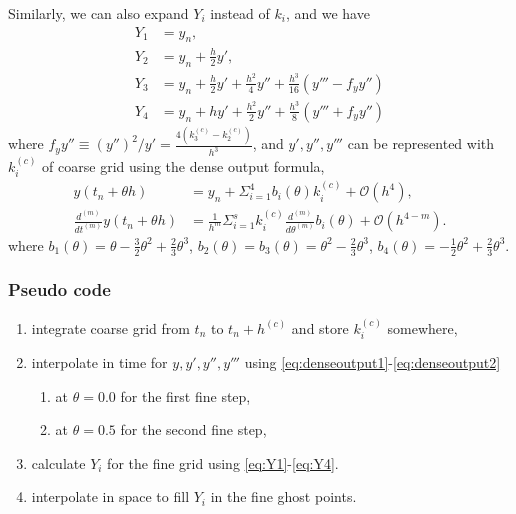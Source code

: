 \documentclass[prd,aps,a4paper,superscriptaddress,onecolumn,footinbib]{revtex4}
\begin{document}
Similarly, we can also expand $Y_i$ instead of $k_i$, and we have
\begin{align}
    Y_1&=y_n, \label{eq:Y1} \\
    Y_2&=y_n + \frac{h}{2}y', \label{eq:Y2} \\
    Y_3&=y_n + \frac{h}{2}y' + \frac{h^2}{4}y''+\frac{h^3}{16}(y'''-f_yy'') \label{eq:Y3} \\
    Y_4&=y_n + hy' + \frac{h^2}{2}y''+\frac{h^3}{8}(y'''+f_yy'') \label{eq:Y4}
\end{align}
where $f_yy''\equiv\left(y''\right)^2/y'=\frac{4(k^{(c)}_3-k^{(c)}_2)}{h^3}$,
and $y',y'',y'''$ can be represented with $k^{(c)}_i$ of coarse grid using the dense output formula,
\begin{align}
    y(t_n+\theta h)
    &=y_n+\Sigma_{i=1}^4b_i(\theta)k^{(c)}_i+\mathcal{O}(h^4),
    \label{eq:denseoutput1} \\
    \frac{d^{(m)}}{dt^{(m)}}y(t_n+\theta h)
    &=\frac{1}{h^m}\Sigma_{i=1}^sk^{(c)}_i
    \frac{d^{(m)}}{d\theta^{(m)}}b_i(\theta)+\mathcal{O}(h^{4-m}).
    \label{eq:denseoutput2}
\end{align}
where
$b_1(\theta)=\theta-\frac{3}{2}\theta^2+\frac{2}{3}\theta^3$,
$b_2(\theta)=b_3(\theta)=\theta^2-\frac{2}{3}\theta^3$,
$b_4(\theta)=-\frac{1}{2}\theta^2+\frac{2}{3}\theta^3$.

\subsubsection{Pseudo code}
\begin{enumerate}
    \item integrate coarse grid from $t_n$ to $t_n+h^{(c)}$ and store $k^{(c)}_i$
        somewhere,
    \item interpolate in time for $y,y',y'',y'''$ using
        \eqref{eq:denseoutput1}-\eqref{eq:denseoutput2}
        \begin{enumerate}[label=(\alph*)]
            \item at $\theta=0.0$ for the first fine step,
            \item at $\theta=0.5$ for the second fine step,
        \end{enumerate}
    \item calculate $Y_i$ for the fine grid using \eqref{eq:Y1}-\eqref{eq:Y4}.
    \item interpolate in space to fill $Y_i$ in the fine ghost points.
\end{enumerate}



%
%
\end{document}
